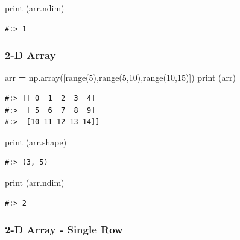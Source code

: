 \documentclass[
]{book}
\newenvironment{Shaded}{\begin{snugshade}}{\end{snugshade}}
\newcommand{\BuiltInTok}[1]{#1}
\newcommand{\DecValTok}[1]{\textcolor[rgb]{0.06,0.06,0.06}{#1}}
\newcommand{\NormalTok}[1]{#1}
\newcommand{\OperatorTok}[1]{\textcolor[rgb]{0.43,0.43,0.43}{\textbf{#1}}}
\begin{document}
\begin{Shaded}
\begin{Highlighting}[]
\BuiltInTok{print}\NormalTok{ (arr.ndim)}
\end{Highlighting}
\end{Shaded}

\begin{verbatim}
#:> 1
\end{verbatim}

\hypertarget{d-array-2}{%
\subsubsection{2-D Array}\label{d-array-2}}

\begin{Shaded}
\begin{Highlighting}[]
\NormalTok{arr }\OperatorTok{=}\NormalTok{ np.array([}\BuiltInTok{range}\NormalTok{(}\DecValTok{5}\NormalTok{),}\BuiltInTok{range}\NormalTok{(}\DecValTok{5}\NormalTok{,}\DecValTok{10}\NormalTok{),}\BuiltInTok{range}\NormalTok{(}\DecValTok{10}\NormalTok{,}\DecValTok{15}\NormalTok{)])}
\BuiltInTok{print}\NormalTok{ (arr)}
\end{Highlighting}
\end{Shaded}

\begin{verbatim}
#:> [[ 0  1  2  3  4]
#:>  [ 5  6  7  8  9]
#:>  [10 11 12 13 14]]
\end{verbatim}

\begin{Shaded}
\begin{Highlighting}[]
\BuiltInTok{print}\NormalTok{ (arr.shape)}
\end{Highlighting}
\end{Shaded}

\begin{verbatim}
#:> (3, 5)
\end{verbatim}

\begin{Shaded}
\begin{Highlighting}[]
\BuiltInTok{print}\NormalTok{ (arr.ndim)}
\end{Highlighting}
\end{Shaded}

\begin{verbatim}
#:> 2
\end{verbatim}

\hypertarget{d-array---single-row}{%
\subsubsection{2-D Array - Single Row}\label{d-array---single-row}}
\end{document}

